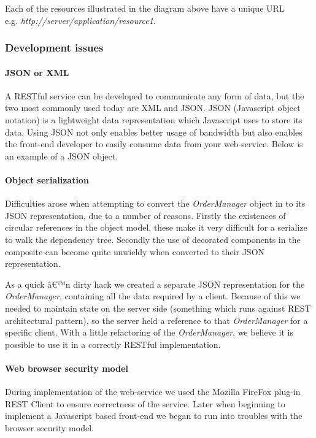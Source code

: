 \documentclass[pdftex,11pt,a4paper]{article}
\begin{document}


Each of the resources illustrated in the diagram above have a unique URL \\ e.g. \emph{http://server/application/resource1}.

\subsubsection{Development issues}

\paragraph{JSON or XML}
A RESTful service can be developed to communicate any form of data, but the two most commonly used today are XML and JSON. JSON (Javascript object notation) is a lightweight data representation which Javascript uses to store its data. Using JSON not only enables better usage of bandwidth but also enables the front-end developer to easily consume data from your web-service. Below is an example of a JSON object.



\paragraph{Object serialization}
Difficulties arose when attempting to convert the \emph{OrderManager} object in to its JSON representation, due to a number of reasons. Firstly the existences of circular references in the object model, these make it very difficult for a serialize to walk the dependency tree. Secondly the use of decorated components in the composite can become quite unwieldy when converted to their JSON representation.

As a quick â€™n dirty hack we created a separate JSON representation for the \emph{OrderManager}, containing all the data required by a client. Because of this we needed to maintain state on the server side (something which runs against REST architectural pattern), so the server held a reference to that \emph{OrderManager} for a specific client.
With a little refactoring of the \emph{OrderManager}, we believe it is possible to use it in a correctly RESTful implementation.

\paragraph{Web browser security model}
During implementation of the web-service we used the Mozilla FireFox plug-in REST Client\cite{website:restClient} to ensure correctness of the service. Later when beginning to implement a Javascript based front-end we began to run into troubles with the browser security model.
\end{document}
